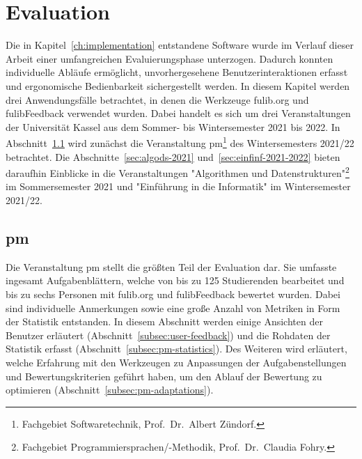 \chapter{Evaluation}\label{ch:evaluation}

Die in Kapitel~\ref{ch:implementation} entstandene Software wurde im Verlauf dieser Arbeit einer umfangreichen Evaluierungsphase unterzogen.
Dadurch konnten individuelle Abläufe ermöglicht, unvorhergesehene Benutzerinteraktionen erfasst und ergonomische Bedienbarkeit sichergestellt werden.
In diesem Kapitel werden drei Anwendungsfälle betrachtet, in denen die Werkzeuge fulib.org und fulibFeedback verwendet wurden.
Dabei handelt es sich um drei Veranstaltungen der Universität Kassel aus dem Sommer- bis Wintersemester 2021 bis 2022.
In Abschnitt~\ref{sec:pm-2021-2022} wird zunächst die Veranstaltung \ac{pm}\footnote{
    Fachgebiet Softwaretechnik, Prof.\ Dr.\ Albert Zündorf.
} des Wintersemesters 2021/22 betrachtet.
Die Abschnitte~\ref{sec:algods-2021} und~\ref{sec:einfinf-2021-2022} bieten daraufhin Einblicke in die Veranstaltungen "Algorithmen und Datenstrukturen"\footnote{
    Fachgebiet Programmiersprachen/-Methodik, Prof.\ Dr.\ Claudia Fohry.\label{fn:fg-plm}
} im Sommersemester 2021 und "Einführung in die Informatik" im Wintersemester 2021/22.


\section{\acl{pm}}\label{sec:pm-2021-2022}

Die Veranstaltung \ac{pm} stellt die größten Teil der Evaluation dar.
Sie umfasste ingesamt  Aufgabenblättern, welche von bis zu 125 Studierenden bearbeitet und bis zu sechs Personen mit fulib.org und fulibFeedback bewertet wurden.
Dabei sind individuelle Anmerkungen sowie eine große Anzahl von Metriken in Form der Statistik entstanden.
In diesem Abschnitt werden einige Ansichten der Benutzer erläutert (Abschnitt~\ref{subsec:user-feedback}) und die Rohdaten der Statistik erfasst (Abschnitt~\ref{subsec:pm-statistics}).
Des Weiteren wird erläutert, welche Erfahrung mit den Werkzeugen zu Anpassungen der Aufgabenstellungen und Bewertungskriterien geführt haben, um den Ablauf der Bewertung zu optimieren (Abschnitt~\ref{subsec:pm-adaptations}).

